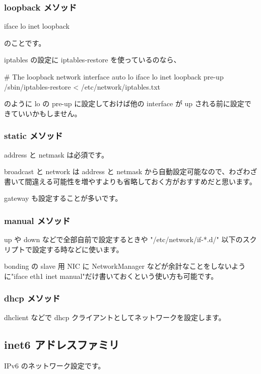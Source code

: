 \documentclass[mingoth,a4paper,twoside]{jsarticle}
\begin{document}
\subsubsection{loopback メソッド}

\begin{commandline}
iface lo inet loopback
\end{commandline}

のことです。

iptables の設定に iptables-restore を使っているのなら、

\begin{commandline}
 # The loopback network interface
 auto lo
 iface lo inet loopback
   pre-up /sbin/iptables-restore < /etc/network/iptables.txt
\end{commandline}

のように lo の pre-up に設定しておけば他の interface が up される前に設定できていいかもしません。

\subsubsection{static メソッド}

address と netmask は必須です。

broadcast と network は address と netmask から自動設定可能なので、わざわざ書いて間違える可能性を増やすよりも省略しておく方がおすすめだと思います。

gateway も設定することが多いです。

\subsubsection{manual メソッド}

up や down などで全部自前で設定するときや "/etc/network/if-*.d/" 以下のスクリプトで設定する時などに使います。

bonding の slave 用 NIC に NetworkManager などが余計なことをしないように"iface eth1 inet manual"だけ書いておくという使い方も可能です。

\subsubsection{dhcp メソッド}

dhclient などで dhcp クライアントとしてネットワークを設定します。

\subsection{inet6 アドレスファミリ}
IPv6 のネットワーク設定です。
\end{document}
